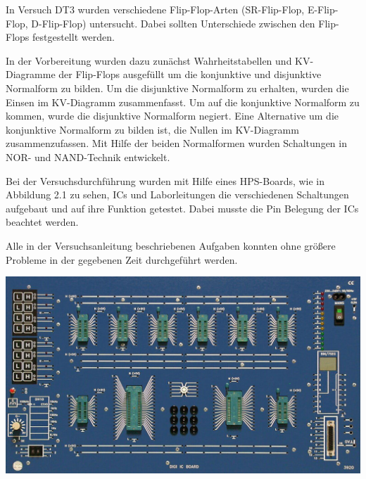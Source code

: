 In Versuch DT3 wurden verschiedene Flip-Flop-Arten (SR-Flip-Flop, E-Flip-Flop, D-Flip-Flop) untersucht. Dabei sollten Unterschiede zwischen den Flip-Flops festgestellt werden. \par
In der Vorbereitung wurden dazu zunächst Wahrheitstabellen und KV-Diagramme der Flip-Flops ausgefüllt um die konjunktive und disjunktive Normalform zu bilden. Um die disjunktive Normalform zu erhalten, wurden die Einsen im KV-Diagramm zusammenfasst. Um auf die konjunktive Normalform zu kommen, wurde die disjunktive Normalform negiert. Eine Alternative um die konjunktive Normalform zu bilden ist, die Nullen im KV-Diagramm zusammenzufassen. Mit Hilfe der beiden Normalformen wurden Schaltungen in NOR- und NAND-Technik entwickelt. \par
Bei der Versuchsdurchführung wurden mit Hilfe eines HPS-Boards, wie in Abbildung 2.1 zu sehen, ICs und Laborleitungen die verschiedenen Schaltungen aufgebaut und auf ihre Funktion getestet. Dabei musste die Pin Belegung der ICs beachtet werden. \par
Alle in der Versuchsanleitung beschriebenen Aufgaben konnten ohne größere Probleme in der gegebenen Zeit durchgeführt werden.\\
\vspace{10mm}
\begin{center}
\includegraphics[width=0.75\columnwidth]{DT3Graphics/HPSBoard.jpg}
\end{center}
